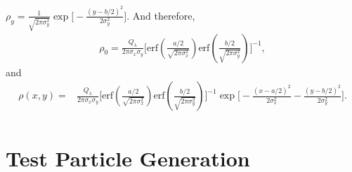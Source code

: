 \documentclass[11pt,oneside]{article}
\begin{document}
$\rho_{y} = \frac{1}{\sqrt{2 \pi \sigma_{y}^{2}}} 
            \exp \bigg[ - \frac{ \left( y - b/2 \right)^{2} }
                               { 2\sigma_{y}^{2}} \bigg] $. And therefore,
\begin{equation}
\begin{split}
  \rho_{0}
= \frac{Q_{\lambda}}{ 2 \pi \sigma_{x} \sigma_{y} }
    \Bigg[
      \mbox{erf} \left( \frac{a/2}{\sqrt{2 \pi \sigma_{x}^{2}}} \right)
      \mbox{erf} \left( \frac{b/2}{\sqrt{2 \pi \sigma_{y}^{2}}} \right) 
    \Bigg]^{-1} , 
\end{split}
\end{equation}
and
\begin{equation}
\begin{split}
  \rho (x,y)
= & \frac{Q_{\lambda}}{ 2 \pi \sigma_{x} \sigma_{y} }
    \Bigg[
      \mbox{erf} \left( \frac{a/2}{\sqrt{2 \pi \sigma_{x}^{2}}} \right)
      \mbox{erf} \left( \frac{b/2}{\sqrt{2 \pi \sigma_{y}^{2}}} \right) 
    \Bigg]^{-1}
    \exp \Bigg[
       - \frac{ \left( x - a/2 \right)^{2} }{ 2\sigma_{x}^{2}}
       - \frac{ \left( y - b/2 \right)^{2} }{ 2\sigma_{y}^{2}}
         \Bigg] . \\
\end{split}
\end{equation}


\section{Test Particle Generation}
\end{document}
